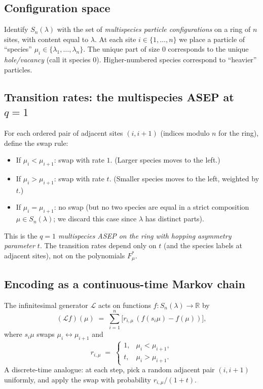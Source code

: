 \subsection*{Configuration space}

Identify $S_n(\lambda)$ with the set of \emph{multispecies particle configurations} on a ring of $n$ sites, with content equal to $\lambda$.  At each site $i\in\{1,\ldots,n\}$ we place a particle of ``species'' $\mu_i\in\{\lambda_1,\ldots,\lambda_n\}$.  The unique part of size $0$ corresponds to the unique \emph{hole/vacancy} (call it species $0$).  Higher-numbered species correspond to ``heavier'' particles.

\subsection*{Transition rates: the multispecies ASEP at $q=1$}

For each ordered pair of adjacent sites $(i,i+1)$ (indices modulo $n$ for the ring), define the swap rule:
\begin{itemize}\setlength\itemsep{2pt}
\item If $\mu_i<\mu_{i+1}$: swap with rate $1$.  (Larger species moves to the left.)
\item If $\mu_i>\mu_{i+1}$: swap with rate $t$.  (Smaller species moves to the left, weighted by $t$.)
\item If $\mu_i=\mu_{i+1}$: no swap (but no two species are equal in a strict composition $\mu\in S_n(\lambda)$; we discard this case since $\lambda$ has distinct parts).
\end{itemize}

This is the \emph{$q=1$ multispecies ASEP on the ring with hopping asymmetry parameter $t$}.  The transition rates depend only on $t$ (and the species labels at adjacent sites), not on the polynomials $F^*_\mu$.

\subsection*{Encoding as a continuous-time Markov chain}

The infinitesimal generator $\mathcal L$ acts on functions $f:S_n(\lambda)\to\mathbb R$ by
\[
(\mathcal L f)(\mu) \;=\; \sum_{i=1}^n \bigl[r_{i,\mu}\,(f(s_i\mu)-f(\mu))\bigr],
\]
where $s_i\mu$ swaps $\mu_i\leftrightarrow\mu_{i+1}$ and
\[
r_{i,\mu}\;=\;\begin{cases}1,&\mu_i<\mu_{i+1},\\ t,&\mu_i>\mu_{i+1}.\end{cases}
\]
A discrete-time analogue: at each step, pick a random adjacent pair $(i,i+1)$ uniformly, and apply the swap with probability $r_{i,\mu}/(1+t)$.

